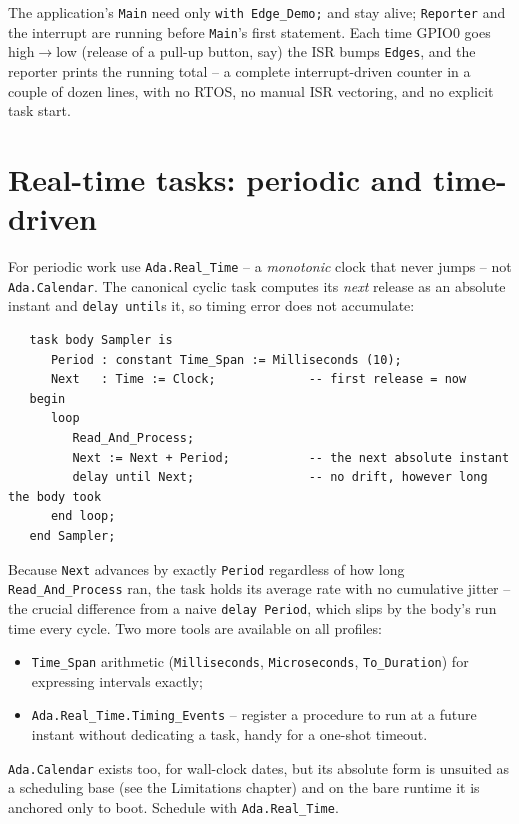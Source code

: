 The application's \texttt{Main} need only \texttt{with Edge\_Demo;} and stay
alive; \texttt{Reporter} and the interrupt are running before \texttt{Main}'s
first statement. Each time GPIO0 goes high$\rightarrow$low (release of a pull-up
button, say) the ISR bumps \texttt{Edges}, and the reporter prints the running
total -- a complete interrupt-driven counter in a couple of dozen lines, with no
RTOS, no manual ISR vectoring, and no explicit task start.

\section{Real-time tasks: periodic and time-driven}
\label{sec:realtime}

For periodic work use \texttt{Ada.Real\_Time} -- a \emph{monotonic} clock that
never jumps -- not \texttt{Ada.Calendar}. The canonical cyclic task computes its
\emph{next} release as an absolute instant and \texttt{delay until}s it, so timing
error does not accumulate:

\begin{lstlisting}
   task body Sampler is
      Period : constant Time_Span := Milliseconds (10);
      Next   : Time := Clock;             -- first release = now
   begin
      loop
         Read_And_Process;
         Next := Next + Period;           -- the next absolute instant
         delay until Next;                -- no drift, however long the body took
      end loop;
   end Sampler;
\end{lstlisting}

Because \texttt{Next} advances by exactly \texttt{Period} regardless of how long
\texttt{Read\_And\_Process} ran, the task holds its average rate with no cumulative
jitter -- the crucial difference from a naive \texttt{delay Period}, which slips
by the body's run time every cycle. Two more tools are available on all profiles:

\begin{itemize}
  \item \texttt{Time\_Span} arithmetic (\texttt{Milliseconds},
        \texttt{Microseconds}, \texttt{To\_Duration}) for expressing intervals
        exactly;
  \item \texttt{Ada.Real\_Time.Timing\_Events} -- register a procedure to run at
        a future instant without dedicating a task, handy for a one-shot timeout.
\end{itemize}

\texttt{Ada.Calendar} exists too, for wall-clock dates, but its absolute form is
unsuited as a scheduling base (see the Limitations chapter) and on the bare
runtime it is anchored only to boot. Schedule with \texttt{Ada.Real\_Time}.

